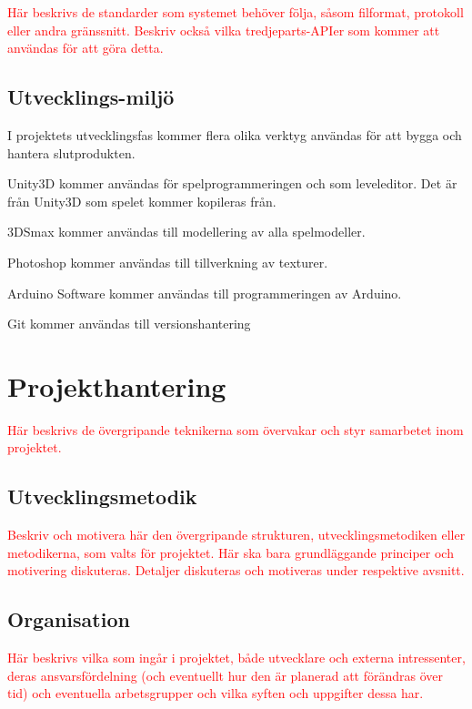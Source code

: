 \documentclass[a4paper,12pt,oneside,final]{extbook}
\begin{document}
\textcolor{red}{Här beskrivs de standarder som systemet behöver följa, såsom filformat, protokoll eller andra gränssnitt.
Beskriv också vilka tredjeparts-APIer som kommer att användas för att göra detta.}

\section{Utvecklings-miljö}

I projektets utvecklingsfas kommer flera olika verktyg användas för att bygga och hantera slutprodukten.

Unity3D kommer användas för spelprogrammeringen och som leveleditor. Det är från Unity3D som spelet kommer kopileras från.

3DSmax kommer användas till modellering av alla spelmodeller.

Photoshop kommer användas till tillverkning av texturer.

Arduino Software kommer användas till programmeringen av Arduino.

Git kommer användas till versionshantering


\chapter{Projekthantering}

\textcolor{red}{Här beskrivs de övergripande teknikerna som övervakar och styr samarbetet inom projektet.}

\section{Utvecklingsmetodik}

\textcolor{red}{Beskriv och motivera här den övergripande strukturen, utvecklingsmetodiken eller metodikerna, som
	valts för projektet. Här ska bara grundläggande principer och motivering diskuteras. Detaljer diskuteras
	och motiveras under respektive avsnitt.
}

\section{Organisation}

\textcolor{red}{Här beskrivs vilka som ingår i projektet, både utvecklare och externa intressenter, deras ansvarsfördelning
	(och eventuellt hur den är planerad att förändras över tid) och eventuella arbetsgrupper och
	vilka syften och uppgifter dessa har.}
\end{document}

